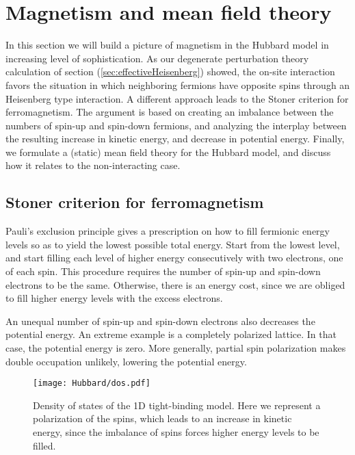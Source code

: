 \section{Magnetism and mean field theory}\label{sec:magMFT}

In this section we will build a picture of magnetism in the Hubbard model in increasing level of sophistication.
As our degenerate perturbation theory  calculation of section (\ref{sec:effectiveHeisenberg}) showed, the on-site interaction favors the situation in which neighboring fermions have opposite spins through an Heisenberg type interaction.
A different approach leads to the Stoner criterion for ferromagnetism.
The argument is based on creating an imbalance between the numbers of spin-up and spin-down fermions, and analyzing the interplay between the resulting increase in kinetic energy, and decrease in potential energy.
Finally, we formulate a (static) mean field theory for the Hubbard model, and discuss how it relates to the non-interacting case.

\subsection{Stoner criterion for ferromagnetism}
\label{subsec:stoner}

Pauli's exclusion principle gives a prescription on how to fill fermionic energy levels so as to yield the lowest possible total energy.
Start from the lowest level, and start filling each level of higher energy consecutively with two electrons, one of each spin.
This procedure requires the number of spin-up and spin-down electrons to be the same.
Otherwise, there is an energy cost, since we are obliged to fill higher energy levels with the excess electrons.

An unequal number of spin-up and spin-down electrons also decreases the potential energy.
An extreme example is a completely polarized lattice.
In that case, the potential energy is zero.
More generally, partial spin polarization makes double occupation unlikely, lowering the potential energy.

\begin{figure}[H]
	\centering
\hspace{12mm}\texttt{[image: Hubbard/dos.pdf]}
	\caption[Density of states of the \acs{1D} tight-binding model.]{Density of states of the \acs{1D} tight-binding model.
	Here we represent a polarization of the spins, which leads to an increase in kinetic energy, since the imbalance of spins forces higher energy levels to be filled.}
	\label{fig:dos}
\end{figure}

